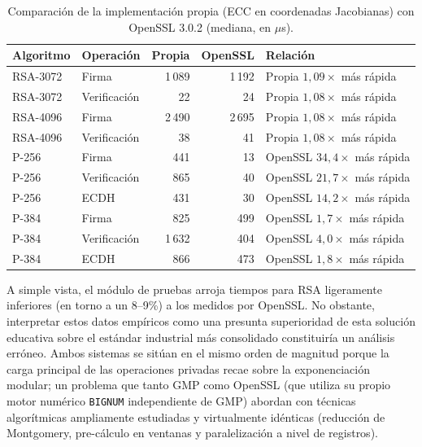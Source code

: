 \begin{table}[htbp]
\centering
\small
\begin{tabular}{llrrl}
\hline
\textbf{Algoritmo} & \textbf{Operación} & \textbf{Propia} & \textbf{OpenSSL} & \textbf{Relación} \\
\hline
RSA-3072 & Firma        & 1\,089 & 1\,192 & Propia $1{,}09\times$ más rápida \\
RSA-3072 & Verificación & 22     & 24     & Propia $1{,}08\times$ más rápida \\
RSA-4096 & Firma        & 2\,490 & 2\,695 & Propia $1{,}08\times$ más rápida \\
RSA-4096 & Verificación & 38     & 41     & Propia $1{,}08\times$ más rápida \\
\hline
P-256 & Firma     & 441 & 13  & OpenSSL $34{,}4\times$ más rápida \\
P-256 & Verificación & 865 & 40  & OpenSSL $21{,}7\times$ más rápida \\
P-256 & ECDH      & 431 & 30  & OpenSSL $14{,}2\times$ más rápida \\
P-384 & Firma     & 825 & 499 & OpenSSL $1{,}7\times$ más rápida \\
P-384 & Verificación & 1\,632 & 404 & OpenSSL $4{,}0\times$ más rápida \\
P-384 & ECDH      & 866 & 473 & OpenSSL $1{,}8\times$ más rápida \\
\hline
\end{tabular}
\caption{Comparación de la implementación propia (ECC en coordenadas Jacobianas) con OpenSSL 3.0.2 (mediana, en $\mu$s).}
\label{tab:res-openssl}
\end{table}

A simple vista, el módulo de pruebas arroja tiempos para RSA ligeramente inferiores (en torno a un 8--9\%) a los medidos por OpenSSL. No obstante, interpretar estos datos empíricos como una 
presunta superioridad de esta solución educativa sobre el estándar industrial más consolidado constituiría un análisis erróneo. Ambos sistemas se sitúan en el mismo orden de magnitud porque 
la carga principal de las operaciones privadas recae sobre la exponenciación modular; un problema que tanto GMP como OpenSSL (que utiliza su propio motor numérico \texttt{BIGNUM} independiente 
de GMP) abordan con técnicas algorítmicas ampliamente estudiadas y virtualmente idénticas (reducción de Montgomery, pre-cálculo en ventanas y paralelización a nivel de registros).

